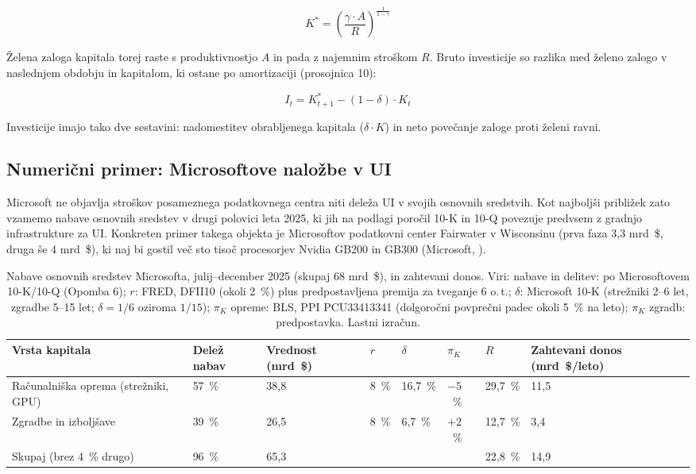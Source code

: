 \documentclass[12pt,a4paper]{article}
\begin{document}
\[
K^{*} = \left(\frac{\gamma \cdot A}{R}\right)^{\frac{1}{1-\gamma}}
\]

Želena zaloga kapitala torej raste s produktivnostjo $A$ in pada z najemnim stroškom $R$. Bruto investicije so razlika med želeno zalogo v naslednjem obdobju in kapitalom, ki ostane po amortizaciji (prosojnica 10):

\[
I_t = K^{*}_{t+1} - (1 - \delta) \cdot K_t
\]

Investicije imajo tako dve sestavini: nadomestitev obrabljenega kapitala ($\delta \cdot K$) in neto povečanje zaloge proti želeni ravni.

\subsection{Numerični primer: Microsoftove naložbe v UI}

Microsoft ne objavlja stroškov posameznega podatkovnega centra niti deleža UI v svojih osnovnih sredstvih. Kot najboljši približek zato vzamemo nabave osnovnih sredstev v drugi polovici leta 2025, ki jih \citet{Epoch2026} na podlagi poročil 10-K in 10-Q povezuje predvsem z gradnjo infrastrukture za UI. Konkreten primer takega objekta je Microsoftov podatkovni center Fairwater v Wisconsinu (prva faza 3,3 mrd~\$, druga še 4 mrd~\$), ki naj bi gostil več sto tisoč procesorjev Nvidia GB200 in GB300 (Microsoft, \citeyear{Microsoft10K2025}).

\begin{table}[htbp]
\centering
\caption{Nabave osnovnih sredstev Microsofta, julij--december 2025 (skupaj 68 mrd~\$), in zahtevani donos. Viri: nabave in delitev: \citet{Epoch2026} po Microsoftovem 10-K/10-Q (Opomba 6); $r$: FRED, DFII10 (okoli 2~\%) plus predpostavljena premija za tveganje 6 o.\,t.; $\delta$: Microsoft 10-K (strežniki 2--6 let, zgradbe 5--15 let; $\delta = 1/6$ oziroma $1/15$); $\pi_K$ opreme: BLS, PPI PCU33413341 (dolgoročni povprečni padec okoli 5~\% na leto); $\pi_K$ zgradb: predpostavka. Lastni izračun.}
\label{tab:nabave}
\small
\setlength{\tabcolsep}{4pt}
\begin{tabular}{L{3.2cm}R{1.2cm}R{1.5cm}R{0.9cm}R{1.2cm}R{1.2cm}R{1.3cm}R{2.3cm}}
\toprule
\textbf{Vrsta kapitala} & \textbf{Delež nabav} & \textbf{Vrednost (mrd~\$)} & $r$ & $\delta$ & $\pi_K$ & $R$ & \textbf{Zahtevani donos (mrd~\$/leto)} \\
\midrule
Računalniška oprema (strežniki, GPU) & 57~\% & 38,8 & 8~\% & 16,7~\% & $-5$~\% & 29,7~\% & 11,5 \\
Zgradbe in izboljšave & 39~\% & 26,5 & 8~\% & 6,7~\% & $+2$~\% & 12,7~\% & 3,4 \\
\midrule
Skupaj (brez 4~\% drugo) & 96~\% & 65,3 & & & & 22,8~\% & 14,9 \\
\bottomrule
\end{tabular}
\end{table}
\end{document}
